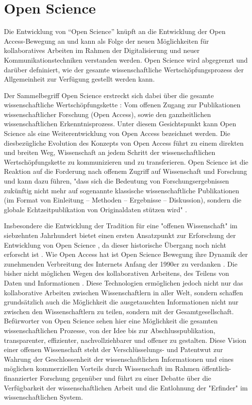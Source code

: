 \section{Open Science}
Die Entwicklung von “Open Science” knüpft an die Entwicklung der Open Access-Bewegung an und kann als Folge der neuen Möglichkeiten für kollaboratives Arbeiten im Rahmen der Digitalisierung und neuer Kommunikationstechniken verstanden werden. Open Science wird abgegrenzt und darüber defniniert, wie der gesamte wissenschaftliche Wertschöpfungsprozess der Allgemeinheit zur Verfügung gestellt werden kann.

Der Sammelbegriff Open Science erstreckt sich dabei über die gesamte wissenschaftliche Wertschöpfungskette \cite{Scheliga_2014}: Vom offenen Zugang zur Publikationen wissenschaftlicher Forschung (Open Access), sowie den ganzheitlichen wissenschaftlichen Erkenntnisprozess. Unter diesem Gesichtspunkt kann Open Science als eine Weiterentwicklung von Open Access bezeichnet werden. Die diesbezügliche Evolution des Konzepts von Open Access führt zu einem direkten und breiten Weg, Wissenschaft an jedem Schritt der wissenschaftlichen Wertschöpfungskette zu kommunizieren und zu transferieren. Open Science ist die Reaktion auf die Forderung nach offenem Zugriff auf Wissenschaft und Forschung und kann dazu führen, "dass sich die Bedeutung von Forschungsergebnissen zukünftig nicht mehr auf sogenannte klassische wissenschaftliche Publikationen (im Format von Einleitung – Methoden – Ergebnisse – Diskussion), sondern die globale Echtzeitpublikation von Originaldaten stützen wird" \cite{Stengel_2013}.

Insbesondere die Entwicklung der Tradition für eine "offenen Wissenschaft" im siebzehnten Jahrhundert bietet einen ersten Ansatzpunkt zur Erforschung der Entwicklung von Open Science \cite{Scheliga_2014}, da dieser historische Übergang noch nicht erforscht ist \cite{CREATe_2014}. Wie Open Access hat ist Open Science Bewegung ihre Dynamik der zunehmenden Verbreitung des Internets Anfang der 1990er zu verdanken \cite{Lievrouw_2010}. Die bisher nicht möglichen Wegen des kollaborativen Arbeitens, des Teilens von Daten und Informationen \cite{Meyer_2013}. Diese Technologien ermöglichen jedoch nicht nur das kollaborative Arbeiten zwischen Wissenschaftlern in aller Welt, sondern schaffen grundsätzlich auch die Möglichkeit die ausgetauschten Informationen nicht nur zwischen den Wissenschaftlern zu teilen, sondern mit der Gesamtgesellschaft. Befürworter von Open Science sehen hier eine Möglichkeit die gesamten wissenschaftlichen Prozesse, von der Idee bis zur Abschlusspublikation, transparenter, effizienter, nachvollziehbarer und offener zu gestalten. Diese Vision einer offenen Wissenschaft steht der Verschlüsselungs- und Patentwut zur Wahrung der Geschlossenheit der wissenschaftlichen Informationen und eines möglichen kommerziellen Vorteils durch Wissenschaft im Rahmen öffentlich-finanzierter Forschung gegenüber und führt zu einer Debatte über die Verfügbarkeit der wissenschaftlichen Arbeit und die Entlohnung der "Erfinder" im wissenschaftlichen System.

